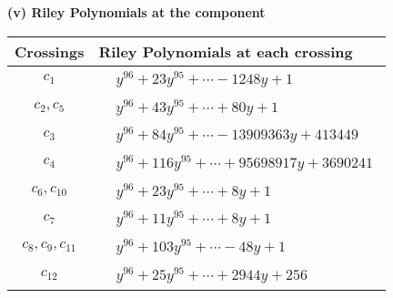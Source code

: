 \documentclass[1p]{elsarticle_modified}
\theoremstyle{definition}
\begin{document}
\newpage\renewcommand{\arraystretch}{1}
\flushleft \textbf{(v) Riley Polynomials at the component}\newline \\
\begin{tabular}{m{50pt}|m{274pt}}
Crossings & \hspace{64pt}Riley Polynomials at each crossing \\
\hline $$\begin{aligned}c_{1}\end{aligned}$$&$\begin{aligned}
&y^{96}+23 y^{95}+\cdots-1248 y+1
\end{aligned}$\\
\hline $$\begin{aligned}c_{2},c_{5}\end{aligned}$$&$\begin{aligned}
&y^{96}+43 y^{95}+\cdots+80 y+1
\end{aligned}$\\
\hline $$\begin{aligned}c_{3}\end{aligned}$$&$\begin{aligned}
&y^{96}+84 y^{95}+\cdots-13909363 y+413449
\end{aligned}$\\
\hline $$\begin{aligned}c_{4}\end{aligned}$$&$\begin{aligned}
&y^{96}+116 y^{95}+\cdots+95698917 y+3690241
\end{aligned}$\\
\hline $$\begin{aligned}c_{6},c_{10}\end{aligned}$$&$\begin{aligned}
&y^{96}+23 y^{95}+\cdots+8 y+1
\end{aligned}$\\
\hline $$\begin{aligned}c_{7}\end{aligned}$$&$\begin{aligned}
&y^{96}+11 y^{95}+\cdots+8 y+1
\end{aligned}$\\
\hline $$\begin{aligned}c_{8},c_{9},c_{11}\end{aligned}$$&$\begin{aligned}
&y^{96}+103 y^{95}+\cdots-48 y+1
\end{aligned}$\\
\hline $$\begin{aligned}c_{12}\end{aligned}$$&$\begin{aligned}
&y^{96}+25 y^{95}+\cdots+2944 y+256
\end{aligned}$\\
\hline
\end{tabular}\\~\\
\end{document}
